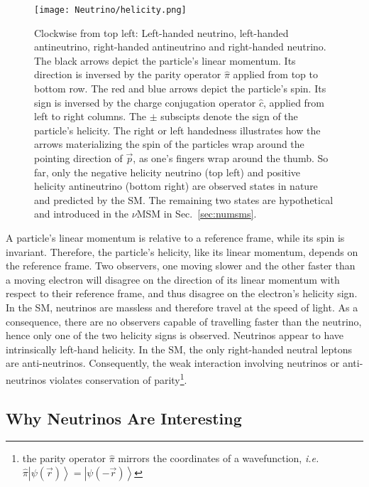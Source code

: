 \begin{figure}
\begin{center}
\texttt{[image: Neutrino/helicity.png]}
\caption{Clockwise from top left: Left-handed neutrino, left-handed antineutrino, right-handed antineutrino and right-handed neutrino. The black arrows depict the particle's linear momentum. Its direction is inversed by the parity operator $\hat{\pi}$ applied from top to bottom row. The red and blue arrows depict the particle's spin. Its sign is inversed by the charge conjugation operator $\hat{c}$, applied from left to right columns. The $\pm$ subscipts denote the sign of the particle's helicity. The right or left handedness illustrates how the arrows materializing the spin of the particles wrap around the pointing direction of $\vec{p}$, as one's fingers wrap around the thumb. So far, only the negative helicity neutrino (top left) and positive helicity antineutrino (bottom right) are observed states in nature and predicted by the SM. The remaining two states are hypothetical and introduced in the $\nu$MSM in Sec.~\ref{sec:numsms}.}
\label{fig:helicity}
\end{center}
\end{figure}

A particle's linear momentum is relative to a reference frame, while its spin is invariant. Therefore, the particle's helicity, like its linear momentum, depends on the reference frame. Two observers, one moving slower and the other faster than a moving electron will disagree on the direction of its linear momentum with respect to their reference frame, and thus disagree on the electron's helicity sign. \\

In the SM, neutrinos are massless and therefore travel at the speed of light. As a consequence, there are no observers capable of travelling faster than the neutrino, hence only one of the two helicity signs is observed. Neutrinos appear to have intrinsically left-hand helicity. In the SM, the only right-handed neutral leptons are anti-neutrinos. Consequently, the weak interaction involving neutrinos or anti-neutrinos violates conservation of parity\footnote{the parity operator $\hat{\pi}$ mirrors the coordinates of a wavefunction, \textit{i.e.} $\hat{\pi} \left\vert \psi (\vec{r}) \right\rangle = \left\vert \psi (-\vec{r}) \right\rangle$}.  \\




\subsection{Why Neutrinos Are Interesting}

